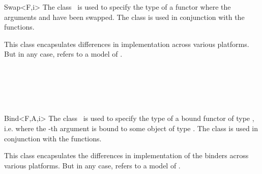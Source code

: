 \begin{ccRefClass}{Swap<F,i>}
  \ccDefinition The class \ccRefName\ is used to specify the type of a
  functor where the arguments  and  have been swapped.
  The class is used in conjunction with the  functions.


  \ccTypes
  
   This class encapsulates differences in
  implementation across various platforms. But in any case, 
  refers to a model of .

  \ccSeeAlso
  \\
  \\
  \\
  \\
  
\end{ccRefClass}

\begin{ccRefClass}{Bind<F,A,i>}
  \ccDefinition The class \ccRefName\ is used to specify the type of a
  bound functor of type , i.e. where the -th argument is
  bound to some object of type . The class is used in
  conjunction with the  functions.


  \ccTypes
  
   This class encapsulates the differences in
  implementation of the binders across various platforms. But in any
  case,  refers to a model of .

  \ccSeeAlso
  \\
  \\
  \\
  \\
  \\ 
  
\end{ccRefClass}


